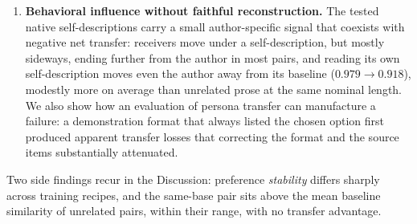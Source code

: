 \documentclass[11pt]{article}
\begin{document}
\begin{enumerate}
  another model ($+0.185$, against $+0.198$ for the policy text), while the
  same receivers reading native self-descriptions on the same items show no
  gain. Receivers can execute a compact semantic self-description; the
  contrast does not isolate why the tested native descriptions fail, since
  the policy writer had an explicit specification in its prompt and the
  targets differ in headroom.
  \item \textbf{Behavioral influence without faithful reconstruction.}
  The tested native self-descriptions carry a small author-specific signal
  that coexists with negative net transfer: receivers move under a
  self-description, but mostly sideways, ending further from the author in
  most pairs, and reading its own self-description moves even the author
  away from its baseline ($0.979 \to 0.918$), modestly more on average than
  unrelated prose at the same nominal length. We also show how an evaluation of
  persona transfer can manufacture a failure: a demonstration format that
  always listed the chosen option first produced apparent transfer losses
  that correcting the format and the source items substantially attenuated.
\end{enumerate}
Two side findings recur in the Discussion: preference
\emph{stability} differs sharply across training recipes, and the same-base
pair sits above the mean baseline similarity of unrelated pairs, within
their range, with no transfer advantage.

\end{document}
